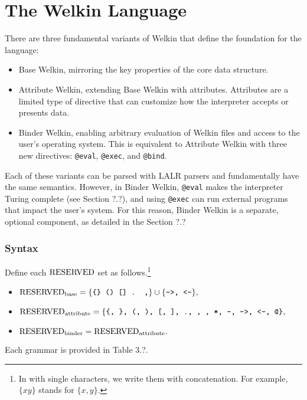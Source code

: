 \section{The Welkin Language}

There are three fundamental variants of Welkin that define the foundation for the language:
\begin{itemize}
	\item Base Welkin, mirroring the key properties of the core data structure.
	\item Attribute Welkin, extending Base Welkin with attributes. Attributes are a limited type of directive that can customize how the interpreter accepts or presents data.
	\item Binder Welkin, enabling arbitrary evaluation of Welkin files and access to the user's operating system. This is equivalent to Attribute Welkin with three new directives: \texttt{@eval}, \texttt{@exec}, and \texttt{@bind}. \end{itemize}
Each of these variants can be parsed with LALR parsers and fundamentally have the same semantics. However, in Binder Welkin, \texttt{@eval} makes the interpreter Turing complete (see Section ?.?), and using \texttt{@exec} can run external programs that impact the user's system. For this reason, Binder Welkin is a separate, optional component, as detailed in the Section ?.?

\subsubsection*{Syntax}
Define each $\mathrm{RESERVED}$ set as follows.\footnote{In with single characters, we write them with concatenation. For example, $\{xy\}$ stands for $\{x, y\}.$}
\begin{itemize}
\item $\mathrm{RESERVED}_{\textrm{base}} = \{\texttt{\{\} () [] . ,}\} \cup \{\texttt{->, <-}\},$
\item $\mathrm{RESERVED}_{\textrm{attribute}} = \{\texttt{\{, \}, (, ), [, ], ., , , *, -, ->, <-, @\}},$ %
\item $\mathrm{RESERVED}_{\textrm{binder}} = \mathrm{RESERVED}_{\textrm{attribute}}.$
\end{itemize}
Each grammar is provided in Table 3.?.

